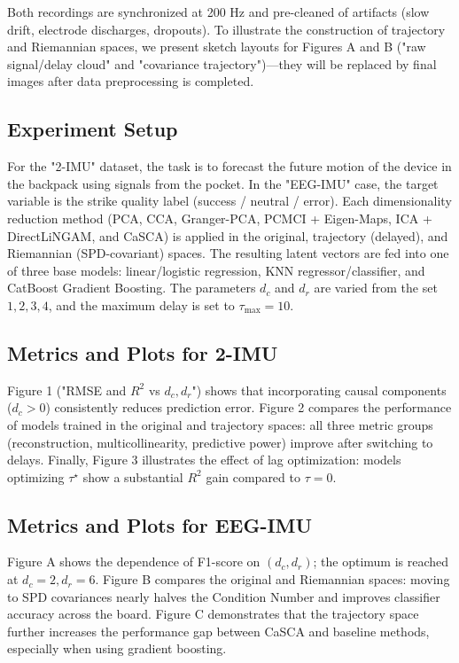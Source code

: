 \documentclass[14pt]{extarticle}
\begin{document}
	Both recordings are synchronized at 200 Hz and pre-cleaned of artifacts (slow drift, electrode discharges, dropouts).  
	To illustrate the construction of trajectory and Riemannian spaces, we present sketch layouts for Figures A and B ("raw signal/delay cloud" and "covariance trajectory")—they will be replaced by final images after data preprocessing is completed.
	
	\subsection{Experiment Setup}
	
	For the "2-IMU" dataset, the task is to forecast the future motion of the device in the backpack using signals from the pocket.  
	In the "EEG-IMU" case, the target variable is the strike quality label (success / neutral / error).  
	Each dimensionality reduction method (PCA, CCA, Granger-PCA, PCMCI + Eigen-Maps, ICA + DirectLiNGAM, and CaSCA) is applied in the original, trajectory (delayed), and Riemannian (SPD-covariant) spaces.  
	The resulting latent vectors are fed into one of three base models: linear/logistic regression, KNN regressor/classifier, and CatBoost Gradient Boosting.  
	The parameters $d_c$ and $d_r$ are varied from the set ${1,2,3,4}$, and the maximum delay is set to $\tau_{\max} = 10$.
	
	\subsection{Metrics and Plots for 2-IMU}
	
	Figure 1 ("RMSE and $R^2$ vs $d_c, d_r$") shows that incorporating causal components ($d_c > 0$) consistently reduces prediction error.  
	Figure 2 compares the performance of models trained in the original and trajectory spaces: all three metric groups (reconstruction, multicollinearity, predictive power) improve after switching to delays.  
	Finally, Figure 3 illustrates the effect of lag optimization: models optimizing $\tau^\star$ show a substantial $R^2$ gain compared to $\tau = 0$.
	
	\subsection{Metrics and Plots for EEG-IMU}
	
	Figure A shows the dependence of F1-score on $(d_c, d_r)$; the optimum is reached at $d_c = 2, d_r = 6$.  
	Figure B compares the original and Riemannian spaces: moving to SPD covariances nearly halves the Condition Number and improves classifier accuracy across the board.  
	Figure C demonstrates that the trajectory space further increases the performance gap between CaSCA and baseline methods, especially when using gradient boosting.
	
\end{document}
